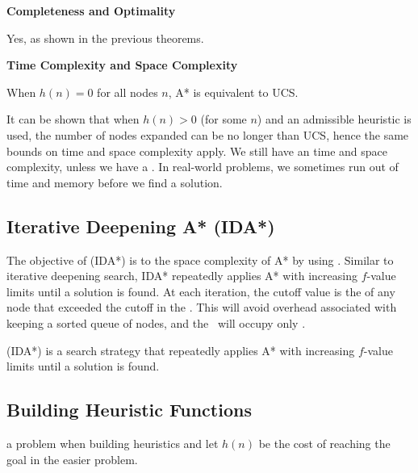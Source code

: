 \begin{listu}
    \item \textbf{Completeness and Optimality}

    Yes, as shown in the previous theorems.
    
    \item \textbf{Time Complexity and Space Complexity}
    
    When $h(n) = 0$ for all nodes $n$, A* is equivalent to UCS.

    It can be shown that when $h(n) > 0$ (for some $n$) and an admissible heuristic is used, the number of nodes expanded can be no longer than UCS, hence the same bounds on time and space complexity apply. We still have an  time and space complexity, unless we have a . In real-world problems, we sometimes run out of time and memory before we find a solution.
\end{listu}

\subsection{Iterative Deepening A* (IDA*)}

The objective of  (IDA*) is to  the  space complexity of A* by using . Similar to iterative deepening search, IDA* repeatedly applies A* with increasing $f$-value limits until a solution is found. At each iteration, the cutoff value is the  of any node that exceeded the cutoff in the . This will avoid overhead associated with keeping a sorted queue of nodes, and the \Frontier~will occupy only .

\begin{definition}\label{def:ida-star}
     (IDA*) is a search strategy that repeatedly applies A* with increasing $f$-value limits until a solution is found.
\end{definition}

\subsection{Building Heuristic Functions}

\begin{remark}
     a problem when building heuristics and let $h(n)$ be the cost of reaching the goal in the easier problem.
\end{remark}

